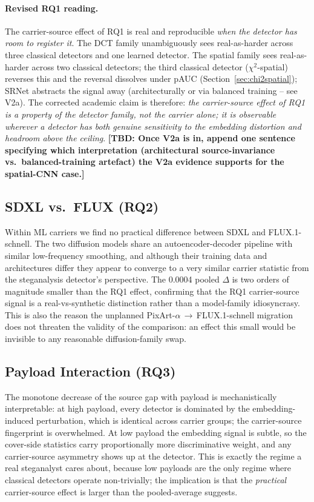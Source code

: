 \documentclass[10pt,twocolumn,a4paper]{article}
\newcommand{\TBD}[1]{\textbf{\color{red}[TBD: #1]}}
\begin{document}
\paragraph{Revised RQ1 reading.} The carrier-source effect of RQ1 is real and reproducible \emph{when the detector has room to register it}. The DCT family unambiguously sees real-as-harder across three classical detectors and one learned detector. The spatial family sees real-as-harder across two classical detectors; the third classical detector ($\chi^2$-spatial) reverses this and the reversal dissolves under pAUC (Section~\ref{sec:chi2spatial}); SRNet abstracts the signal away (architecturally or via balanced training -- see V2a). The corrected academic claim is therefore: \emph{the carrier-source effect of RQ1 is a property of the detector family, not the carrier alone; it is observable wherever a detector has both genuine sensitivity to the embedding distortion and headroom above the ceiling}. \TBD{Once V2a is in, append one sentence specifying which interpretation (architectural source-invariance vs.\ balanced-training artefact) the V2a evidence supports for the spatial-CNN case.}

\subsection{SDXL vs.\ FLUX (RQ2)}

Within ML carriers we find no practical difference between SDXL and FLUX.1-schnell. The two diffusion models share an autoencoder-decoder pipeline with similar low-frequency smoothing, and although their training data and architectures differ they appear to converge to a very similar carrier statistic from the steganalysis detector's perspective. The 0.0004 pooled $\Delta$ is two orders of magnitude smaller than the RQ1 effect, confirming that the RQ1 carrier-source signal is a real-vs-synthetic distinction rather than a model-family idiosyncrasy. This is also the reason the unplanned PixArt-$\alpha$\,$\to$\,FLUX.1-schnell migration does not threaten the validity of the comparison: an effect this small would be invisible to any reasonable diffusion-family swap.

\subsection{Payload Interaction (RQ3)}

The monotone decrease of the source gap with payload is mechanistically interpretable: at high payload, every detector is dominated by the embedding-induced perturbation, which is identical across carrier groups; the carrier-source fingerprint is overwhelmed. At low payload the embedding signal is subtle, so the cover-side statistics carry proportionally more discriminative weight, and any carrier-source asymmetry shows up at the detector. This is exactly the regime a real steganalyst cares about, because low payloads are the only regime where classical detectors operate non-trivially; the implication is that the \emph{practical} carrier-source effect is larger than the pooled-average suggests.
\end{document}
